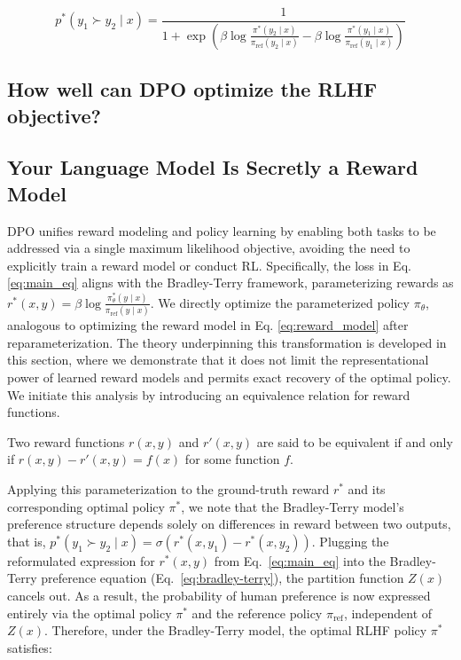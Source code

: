 \begin{equation}\label{eq:objective}
    p^*(y_1\succ y_2 \mid x)=\frac{1}{1 + \exp\left(\beta \log \frac{\pi^*(y_2\mid x)}{\pi_\text{ref}(y_2\mid x)} - \beta \log \frac{\pi^*(y_1\mid x)}{\pi_\text{ref}(y_1\mid x)}\right)}
\end{equation}

\subsection{How well can DPO optimize the RLHF objective?}

\subsection{Your Language Model Is Secretly a Reward Model} DPO unifies reward modeling and policy learning by enabling both tasks to be addressed via a single maximum likelihood objective, avoiding the need to explicitly train a reward model or conduct RL. Specifically, the loss in Eq. \ref{eq:main_eq} aligns with the Bradley-Terry framework, parameterizing rewards as $r^*(x, y) = \beta \log\frac{\pi^*_\theta(y \mid x)}{\pi_\text{ref}(y \mid x)}$. We directly optimize the parameterized policy $\pi_{\theta}$, analogous to optimizing the reward model in Eq. \ref{eq:reward_model} after reparameterization. The theory underpinning this transformation is developed in this section, where we demonstrate that it does not limit the representational power of learned reward models and permits exact recovery of the optimal policy. We initiate this analysis by introducing an equivalence relation for reward functions.

\begin{definition}
Two reward functions $r(x, y)$ and $r'(x, y)$ are said to be equivalent if and only if ${r(x, y)-r'(x, y) = f(x)}$ for some function $f$.
\end{definition}

Applying this parameterization to the ground-truth reward $r^*$ and its corresponding optimal policy $\pi^*$, we note that the Bradley-Terry model’s preference structure depends solely on differences in reward between two outputs, that is, ${p^*(y_1 \succ y_2 \mid x) = \sigma(r^*(x, y_1) - r^*(x, y_2))}$. Plugging the reformulated expression for $r^*(x, y)$ from Eq.~\ref{eq:main_eq} into the Bradley-Terry preference equation (Eq.~\ref{eq:bradley-terry}), the partition function $Z(x)$ cancels out. As a result, the probability of human preference is now expressed entirely via the optimal policy $\pi^*$ and the reference policy $\pi_\text{ref}$, independent of $Z(x)$. Therefore, under the Bradley-Terry model, the optimal RLHF policy $\pi^*$ satisfies:

